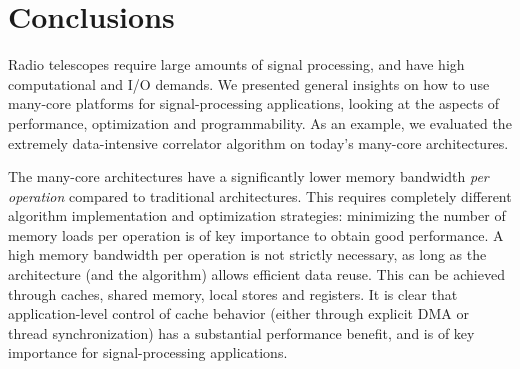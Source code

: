 \documentclass{article}
\newcommand{\longversion}[1]{}
\begin{document}
\longversion{
\section{Applying the techniques: a case study with the Intel Larrabee}

Intel recently disclosed some details about the upcoming Larrabee processor,
a fully programmable GPU based on the well-known x86 instruction set.
Although performance details are unknown, it is interesting to compare the
Larrabee to the aforementioned architectures, and to see how a correlator
should be implemented to obtain optimal performance.

The processing power comes from Larrabee's relatively long vector size:
a vector holds 16~elements, where the other architectures have vectors lengths
of at most~4.
The long vector size forces us to reconsider our parallelization strategy.
There are several options to perform 16~simultaneous FMAs.
One option is to operate on 16~samples with consecutive time stamps.
A minor drawback is that the data must be ``horizontally'' added to integrate,
but this can be done outside the main loop.
Another option is to operate on samples from 16~consecutive frequencies.

Another option is to correlate samples from different receivers as illustrated
by Figure~\ref{fig-correlation}.
This method minimizes memory loads, but requires additional shuffling of data.
Unfortunately, the most efficient method can only be determined empirically,
when the hardware is available.
} %


\section{Conclusions}
\label{conclusions}
Radio telescopes require large amounts of signal processing, 
and have high computational and I/O demands.
We presented general insights on how to use many-core
platforms for signal-processing applications, looking at the aspects of
performance, optimization and programmability.
As an example, we evaluated the extremely
data-intensive correlator algorithm on today's many-core
architectures. 

The many-core architectures have a significantly lower memory
bandwidth \emph{per operation} compared to traditional architectures.
This requires completely different algorithm implementation and optimization strategies:
minimizing the number of memory loads per operation is of key
importance to obtain good performance.  A high memory bandwidth per
operation is not strictly necessary, as long as the architecture (and the
algorithm) allows efficient data reuse.  This can be achieved through
caches, shared memory, local stores and registers.  It is clear that
application-level control of cache behavior (either through explicit
DMA or thread synchronization) has a substantial performance benefit,
and is of key importance for signal-processing
applications.
\end{document}

